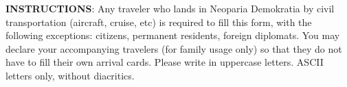 




\begin{minipage}{\textwidth}
	\small
	\textbf{INSTRUCTIONS}:
	\inlinelistitem Any traveler who lands in Neoparia Demokratia by civil transportation (aircraft, cruise, etc) is required to fill this form, with the following exceptions: citizens, permanent residents, foreign diplomats.
    \inlinelistitem You may declare your accompanying travelers (for family usage only) so that they do not have to fill their own arrival cards.
    \inlinelistitem Please write in uppercase letters. ASCII letters only, without diacritics.
\end{minipage}
\vskip 20pt


\formbrickcontentheight=40pt


